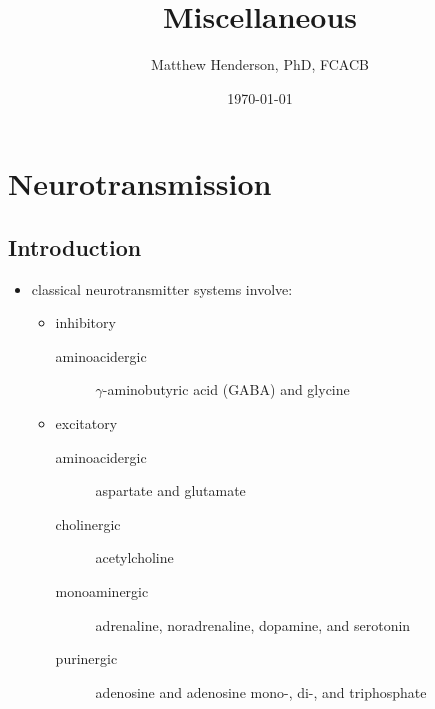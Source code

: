 \documentclass[12pt]{scrartcl}
\author{Matthew Henderson, PhD, FCACB}
\date{\today}
\title{Miscellaneous}
\begin{document}
\maketitle
\setcounter{tocdepth}{2}
\tableofcontents



\section{Neurotransmission}
\label{sec:org5023e4a}
\subsection{Introduction}
\label{sec:org5e5bda2}
\begin{itemize}
\item classical neurotransmitter systems involve:
\begin{itemize}
\item inhibitory
\begin{description}
\item[{aminoacidergic}] \(\gamma\)-aminobutyric acid (GABA) and glycine
\end{description}
\item excitatory
\begin{description}
\item[{aminoacidergic}] aspartate and glutamate
\item[{cholinergic}] acetylcholine
\item[{monoaminergic}] adrenaline, noradrenaline, dopamine, and serotonin
\item[{purinergic}] adenosine and adenosine mono-, di-, and triphosphate
\end{description}
\end{itemize}


\end{itemize}
\end{document}
